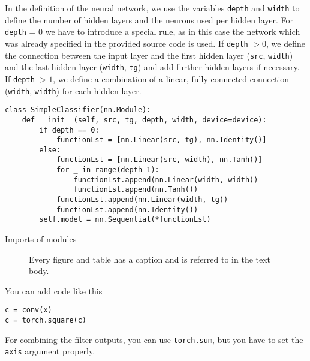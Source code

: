 In the definition of the neural network, we use the variables \lstinline|depth| and \lstinline|width| to define the number of hidden layers and the neurons used per hidden layer. For \lstinline|depth| = 0 we have to introduce a special rule, as in this case the network which was already specified in the provided source code is used. 
If \lstinline|depth| $> 0$, we define the connection between the input layer and the first hidden layer (\lstinline|src|, \lstinline|width|) and the last hidden layer (\lstinline|width|, \lstinline|tg|) and add further hidden layers if necessary. If \lstinline|depth| $> 1$, we define a combination of a linear, fully-connected connection (\lstinline|width|, \lstinline|width|) for each hidden layer. 
\begin{lstlisting}
class SimpleClassifier(nn.Module):
    def __init__(self, src, tg, depth, width, device=device):
        if depth == 0:
            functionLst = [nn.Linear(src, tg), nn.Identity()]
        else:
            functionLst = [nn.Linear(src, width), nn.Tanh()]
            for _ in range(depth-1):
                functionLst.append(nn.Linear(width, width))
                functionLst.append(nn.Tanh())
            functionLst.append(nn.Linear(width, tg))
            functionLst.append(nn.Identity())
        self.model = nn.Sequential(*functionLst)
\end{lstlisting}


Imports of modules

\begin{figure}
  \begin{center}
  \end{center}
  \caption{Every figure and table has a caption and is referred to 
    in the text body.\label{fig:q6p1}}
\end{figure}

You can add code like this
\begin{lstlisting}
c = conv(x)
c = torch.square(c)
\end{lstlisting}

For combining the filter outputs, you can  use 
\lstinline{torch.sum}, but you have to set the \lstinline{axis}
argument properly.